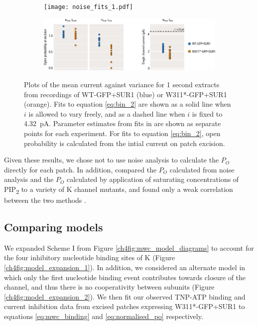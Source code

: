 \begin{figure}[h]
	\centering
	\begin{subfigure}[t]{0.9\textwidth}
		\caption{}\label{ch4fig:noise_fits_1}
		\centering
		\texttt{[image: noise\_fits\_1.pdf]}
	\end{subfigure}
	\vfill
	\begin{subfigure}[t]{0.9\textwidth}
		\caption{}\label{ch4fig:noise_fits_2}
		\centering
		\includegraphics[width=\textwidth]{noise_fits_2.pdf}
	\end{subfigure}
	\caption[Estimating open probability from stationary noise analysis]{
	 Plots of the mean current against variance for 1 second extracts from recordings of WT-GFP+SUR1 (blue) or W311*-GFP+SUR1 (orange).
	Fits to equation \ref{eq:bin_2} are shown as a solid line when $i$ is allowed to vary freely, and as a dashed line when $i$ is fixed to \SI{4.32}{\pico\ampere}.
	 Parameter estimates from fits in  are shown as separate points for each experiment.
	For fits to equation \ref{eq:bin_2}, open probability is calculated from the intial current on patch excision.
	}\label{ch4fig:all_noise_fits}
\end{figure}

Given these results, we chose not to use noise analysis to calculate the $P_O$ directly for each patch.
In addition, \textcite{cukras_role_2002} compared the $P_O$ calculated from noise analysis and the $P_O$ calculated by application of saturating concentrations of PIP\textsubscript{2} to a variety of K\ATP{} channel mutants, and found only a weak correlation between the two methods \cite{cukras_role_2002}.

\subsection{Comparing models}

We expanded Scheme I from Figure \ref{ch4fig:mwc_model_diagrams} to account for the four inhibitory nucleotide binding sites of K\ATP{} (Figure \ref{ch4fig:model_expansion_1}).
In addition, we considered an alternate model in which only the first nucleotide binding event contributes towards closure of the channel, and thus there is no cooperativity between subunits (Figure \ref{ch4fig:model_expansion_2}).
We then fit our observed TNP-ATP binding and current inhibition data from excised patches expressing W311*-GFP+SUR1 to equations \ref{eq:mwc_binding} and \ref{eq:normalised_po} respectively.

